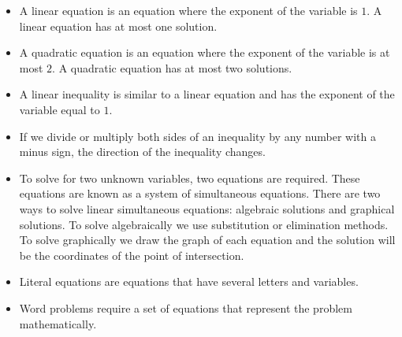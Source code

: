 
\begin{itemize}[noitemsep]
\item A linear equation is an equation where the exponent of the variable is $1$. A linear equation has at most one solution.
\item A quadratic equation is an equation where the exponent of the variable is at most $2$. A quadratic equation has at most two solutions.
\item A linear inequality is similar to a linear equation and has the exponent of the variable equal to $1$.
\item If we divide or multiply both sides of an inequality by any number with a minus sign, the direction of the inequality changes. 
\item To solve for two unknown variables, two equations are
  required. These equations are known as a system of simultaneous
  equations. There are two ways to solve linear simultaneous
  equations: algebraic solutions and graphical solutions. To solve
  algebraically we use substitution or elimination methods. To solve
  graphically we draw the graph of each equation and the solution will
  be the coordinates of the point of intersection.
\item Literal equations are equations that have several letters and variables.
\item Word problems require a set of equations that represent the problem mathematically. 
\end{itemize}

